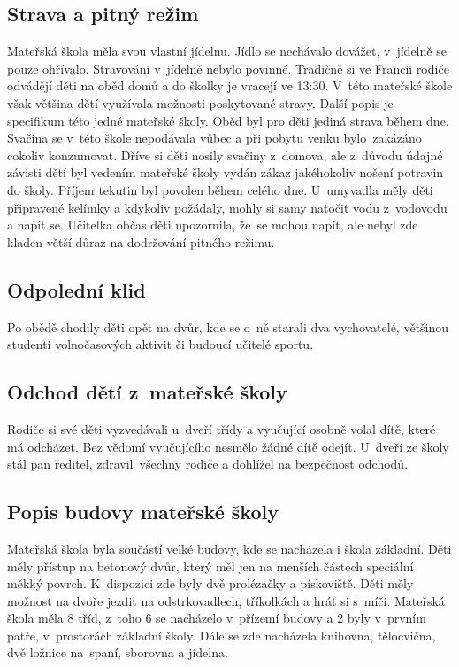 		\subsection{Strava a pitný režim}
			Mateřská škola měla svou vlastní jídelnu. Jídlo se nechávalo dovážet, v~jídelně se pouze ohřívalo. Stravování v jídelně nebylo povinné. Tradičně si ve Francii rodiče odvádějí děti na oběd domů a do školky je vracejí ve 13:30. V~této mateřské škole však většina dětí využívala možnosti poskytované stravy. 
			Další popis je specifikum této jedné mateřské školy. Oběd byl pro děti jediná strava během dne. Svačina se v této škole nepodávala vůbec a při pobytu venku bylo zakázáno cokoliv konzumovat. Dříve si děti nosily svačiny z~domova, ale z~důvodu údajné závisti dětí byl vedením mateřské školy vydán zákaz jakéhokoliv nošení potravin do školy. 
			Příjem tekutin byl povolen během celého dne. U~umyvadla měly děti připravené kelímky a kdykoliv požádaly, mohly si samy natočit vodu z vodovodu a napít se. Učitelka občas děti upozornila, že se mohou napít, ale nebyl zde kladen větší důraz na dodržování pitného režimu.

		\subsection{Odpolední klid}
		\label{spani}
			Po obědě chodily děti opět na dvůr, kde se o~ně starali dva vychovatelé, většinou studenti volnočasových aktivit či budoucí učitelé sportu.

		\subsection{Odchod dětí z~mateřské školy}
			Rodiče si své děti vyzvedávali u~dveří třídy a vyučující osobně volal dítě, které má odcházet. Bez vědomí vyučujícího nesmělo žádné dítě odejít. U~dveří ze školy stál pan ředitel, zdravil všechny rodiče a dohlížel na bezpečnost odchodů. 

		\subsection{Popis budovy mateřské školy}

			Mateřská škola byla součástí velké budovy, kde se nacházela i škola základní. Děti měly přístup na betonový dvůr, který měl jen na menších částech speciální měkký povrch. K~dispozici zde byly dvě prolézačky a pískoviště. Děti měly možnost na dvoře jezdit na odstrkovadlech, tříkolkách a hrát si s~míči. 
			Mateřská škola měla 8 tříd, z~toho 6 se nacházelo v přízemí budovy a 2 byly v prvním patře, v prostorách základní školy. Dále se zde nacházela knihovna, tělocvična, dvě ložnice na spaní, sborovna a jídelna. 

